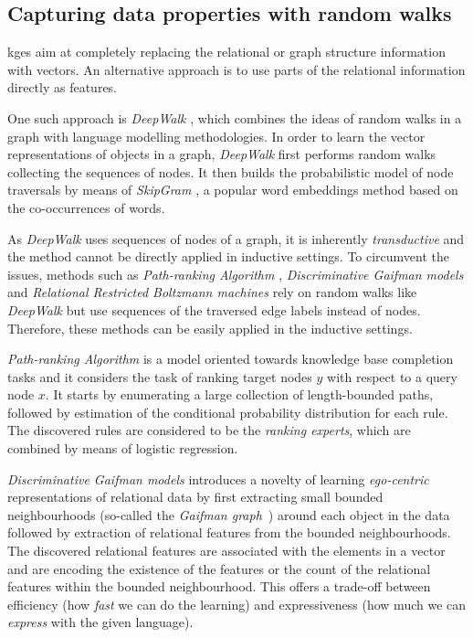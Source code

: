 \subsection{Capturing data properties with random walks}


\gls{kge}s aim at completely replacing the relational or graph structure information with vectors.
An alternative approach is to use parts of the relational information directly as features.


One such approach is \textit{DeepWalk} \cite{Perozzi:2014:DOL:2623330.2623732}, which combines the ideas of random walks in a graph with language modelling methodologies.
In order to learn the vector representations of objects in a graph, \textit{DeepWalk} first performs random walks collecting the sequences of nodes.
It then builds the probabilistic model of node traversals by means of \textit{SkipGram} \cite{NIPS2013_Skipgram}, a popular word embeddings method based on the co-occurrences of words.



As \textit{DeepWalk} uses sequences of nodes of a graph, it is inherently \textit{transductive} and the method cannot be directly applied in inductive settings.
To circumvent the issues, methods such as \textit{Path-ranking Algorithm} \cite{lao2010pra,Lao:2011:RWI:2145432.2145494}, \textit{Discriminative Gaifman models} \cite{Niepert:2016:DGM:3157382.3157479} and \textit{Relational Restricted Boltzmann machines} \cite{KaurILP17} rely on random walks like \textit{DeepWalk} but use sequences of the traversed edge labels instead of nodes.
Therefore, these methods can be easily applied in the inductive settings.



\textit{Path-ranking Algorithm} is a model oriented towards knowledge base completion tasks and it considers the task of ranking target nodes $y$ with respect to a query node $x$.
It starts by enumerating a large collection of length-bounded paths, followed by estimation of the conditional probability distribution for each rule.
The discovered rules are considered to be the \textit{ranking experts}, which are combined by means of logistic regression.




\textit{Discriminative Gaifman models} introduces a novelty of learning \textit{ego-centric} representations of relational data by first extracting small bounded neighbourhoods (so-called the \textit{Gaifman graph}~\cite{GAIFMAN1982105}) around each object in the data followed by extraction of relational features from the bounded neighbourhoods.
The discovered relational features are associated with the elements in a vector and are encoding the existence of the features or the count of the relational features within the bounded neighbourhood.
This offers a trade-off between efficiency (how \textit{fast} we can do the learning) and expressiveness (how much we can \textit{express} with the given language).



